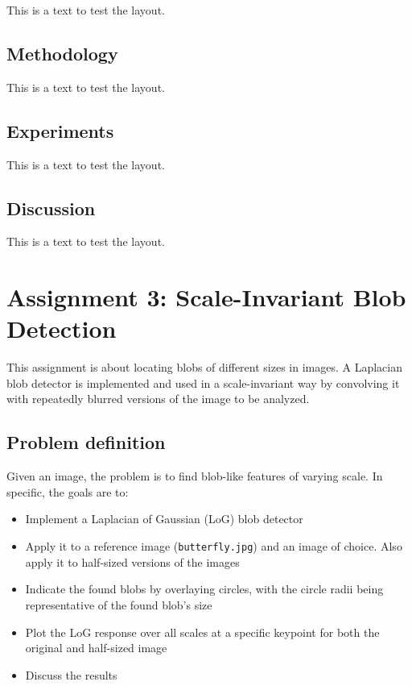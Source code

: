 \documentclass[a4paper,psfig,subfigure,epsfig,fleqn,ausarbeitung,amssmb,float,caption,fontenc]{article}
\begin{document}
This is a text to test the layout.

\subsection{Methodology}

This is a text to test the layout.

\subsection{Experiments}

This is a text to test the layout.

\subsection{Discussion}

This is a text to test the layout.


\section{Assignment 3: Scale-Invariant Blob Detection}
\label{sec:assignment3}

This assignment is about locating blobs of different sizes in images. A Laplacian blob detector is implemented and used in a scale-invariant way by convolving it with repeatedly blurred versions of the image to be analyzed.

\subsection{Problem definition}

Given an image, the problem is to find blob-like features of varying scale. In specific, the goals are to:
\begin{itemize}[noitemsep]
\item Implement a Laplacian of Gaussian (LoG) blob detector
\item Apply it to a reference image (\texttt{butterfly.jpg}) and an image of choice. Also apply it to half-sized versions of the images
\item Indicate the found blobs by overlaying circles, with the circle radii being representative of the found blob's size
\item Plot the LoG response over all scales at a specific keypoint for both the original and half-sized image
\item Discuss the results
\end{itemize}
\end{document}
